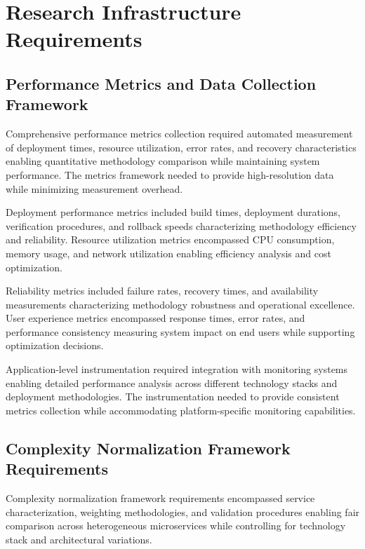 \section{Research Infrastructure Requirements}

\subsection{Performance Metrics and Data Collection Framework}

Comprehensive performance metrics collection required automated measurement of deployment times, resource utilization, error rates, and recovery characteristics enabling quantitative methodology comparison while maintaining system performance. The metrics framework needed to provide high-resolution data while minimizing measurement overhead.

Deployment performance metrics included build times, deployment durations, verification procedures, and rollback speeds characterizing methodology efficiency and reliability. Resource utilization metrics encompassed CPU consumption, memory usage, and network utilization enabling efficiency analysis and cost optimization.


Reliability metrics included failure rates, recovery times, and availability measurements characterizing methodology robustness and operational excellence. User experience metrics encompassed response times, error rates, and performance consistency measuring system impact on end users while supporting optimization decisions.

Application-level instrumentation required integration with monitoring systems enabling detailed performance analysis across different technology stacks and deployment methodologies. The instrumentation needed to provide consistent metrics collection while accommodating platform-specific monitoring capabilities.

\subsection{Complexity Normalization Framework Requirements}

Complexity normalization framework requirements encompassed service characterization, weighting methodologies, and validation procedures enabling fair comparison across heterogeneous microservices while controlling for technology stack and architectural variations.

